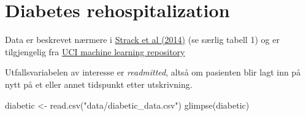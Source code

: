 \documentclass[
  letterpaper,
  DIV=11,
  numbers=noendperiod]{scrreprt}
\newenvironment{Shaded}{\begin{snugshade}}{\end{snugshade}}
\newcommand{\FunctionTok}[1]{\textcolor[rgb]{0.28,0.35,0.67}{#1}}
\newcommand{\NormalTok}[1]{\textcolor[rgb]{0.00,0.23,0.31}{#1}}
\newcommand{\OtherTok}[1]{\textcolor[rgb]{0.00,0.23,0.31}{#1}}
\newcommand{\StringTok}[1]{\textcolor[rgb]{0.13,0.47,0.30}{#1}}
\theoremstyle{definition}
\theoremstyle{remark}
\begin{document}
\hypertarget{diabetes-rehospitalization}{%
\section{Diabetes rehospitalization}\label{diabetes-rehospitalization}}

Data er beskrevet nærmere i
\href{https://www.hindawi.com/journals/bmri/2014/781670/}{Strack et al
(2014)} (se særlig tabell 1) og er tilgjengelig fra
\href{https://archive.ics.uci.edu/ml/datasets/diabetes+130-us+hospitals+for+years+1999-2008}{UCI
machine learning repository}

Utfallsvariabelen av interesse er \emph{readmitted}, altså om pasienten
blir lagt inn på nytt på et eller annet tidspunkt etter utskrivning.

\begin{Shaded}
\begin{Highlighting}[]
\NormalTok{diabetic }\OtherTok{\textless{}{-}} \FunctionTok{read.csv}\NormalTok{(}\StringTok{"data/diabetic\_data.csv"}\NormalTok{)}
\FunctionTok{glimpse}\NormalTok{(diabetic)}
\end{Highlighting}
\end{Shaded}
\end{document}
